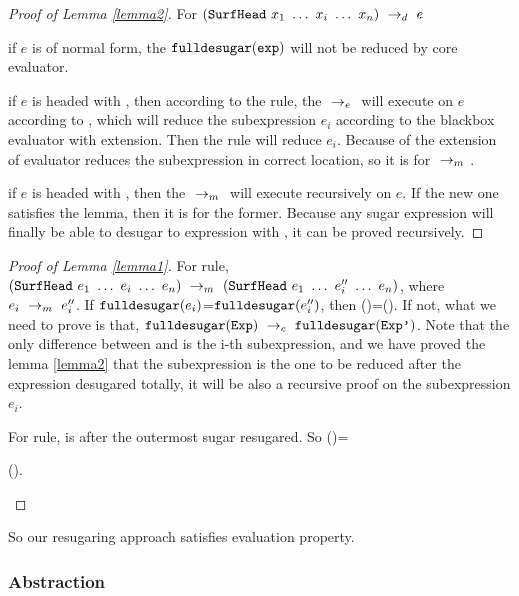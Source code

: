 \begin{proof}[Proof of Lemma \ref{lemma2}]
For $(\mbox{\tt SurfHead}~x_1~\ldots~x_i~\ldots~x_n) ~\rightarrow_d~ e$

if $e$ is of normal form, the $\mbox{\tt fulldesugar}(\mbox{\tt exp})$ will not be reduced by core evaluator.

if $e$ is headed with , then according to the  rule, the $~\rightarrow_e~$ will execute on $e$ according to , which will reduce the subexpression $e_i$ according to the blackbox evaluator with extension. Then the  rule will reduce $e_i$. Because of the extension of evaluator reduces the subexpression in correct location, so it is for $~\rightarrow_m~$.

if $e$ is headed with , then the $~\rightarrow_m~$ will execute recursively on $e$. If the new one satisfies the lemma, then it is for the former. Because any sugar expression will finally be able to desugar to expression with , it can be proved recursively.
\end{proof}
\begin{proof}[Proof of Lemma \ref{lemma1}]
\hfill

For  rule, $(\mbox{\tt SurfHead}~e_1~\ldots~e_i~\ldots~e_n) ~\rightarrow_m~(\mbox{\tt SurfHead}~e_1~\ldots~e_i''~\ldots~e_n)$, where $e_i ~\rightarrow_m~e_i''$.
If $\mbox{\tt fulldesugar}(e_i)$=$\mbox{\tt fulldesugar}(e_i'')$, then ()=(). If not,  what we need to prove is that, $\mbox{\tt fulldesugar}(\mbox{\tt Exp}) ~\rightarrow_c~\mbox{\tt fulldesugar}(\mbox{\tt Exp'})$. Note that the only difference between  and  is the i-th subexpression, and we have proved the lemma \ref{lemma2} that the subexpression is the one to be reduced after the expression desugared totally, it will be also a recursive proof on the subexpression $e_i$.

For  rule,  is  after the outermost sugar resugared. So ()=

\begin{flushleft}
().
\end{flushleft}

\end{proof}

So our resugaring approach satisfies evaluation property.

\subsubsection{Abstraction}
\label{mark:abs}

